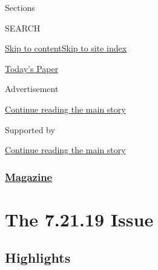Sections

SEARCH

\protect\hyperlink{site-content}{Skip to
content}\protect\hyperlink{site-index}{Skip to site index}

\href{https://myaccount.nytimes3xbfgragh.onion/auth/login?response_type=cookie\&client_id=vi}{}

\href{https://www.nytimes3xbfgragh.onion/section/todayspaper}{Today's
Paper}

Advertisement

\protect\hyperlink{after-top}{Continue reading the main story}

Supported by

\protect\hyperlink{after-sponsor}{Continue reading the main story}

\hypertarget{magazine}{%
\subsubsection{\texorpdfstring{\href{/section/magazine}{Magazine}}{Magazine}}\label{magazine}}

\hypertarget{the-72119-issue}{%
\section{The 7.21.19 Issue}\label{the-72119-issue}}

\hypertarget{highlights}{%
\subsection{Highlights}\label{highlights}}

